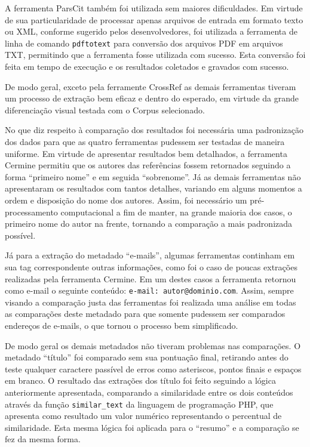 A ferramenta ParsCit também foi utilizada sem maiores dificuldades. Em virtude de sua particularidade de processar apenas arquivos de entrada em formato texto ou XML, conforme sugerido pelos desenvolvedores, foi utilizada a ferramenta de linha de comando \texttt{pdftotext} para conversão dos arquivos PDF em arquivos TXT, permitindo que a ferramenta fosse utilizada com sucesso. Esta conversão foi feita em tempo de execução e os resultados coletados e gravados com sucesso.

De modo geral, exceto pela ferramente CrossRef as demais ferramentas tiveram um processo de extração bem eficaz e dentro do esperado, em virtude da grande diferenciação visual testada com o Corpus selecionado. 


No que diz respeito à comparação dos resultados foi necessária uma padronização dos dados para que as quatro ferramentas pudessem ser testadas de maneira uniforme. Em virtude de apresentar resultados bem detalhados, a ferramenta Cermine permitiu que os autores das referências fossem retornados seguindo a forma ``primeiro nome'' e em seguida ``sobrenome''. Já as demais ferramentas não apresentaram os resultados com tantos detalhes, variando em alguns momentos a ordem e disposição do nome dos autores. Assim, foi necessário um pré-processamento computacional a fim de manter, na grande maioria dos casos, o primeiro nome do autor na frente, tornando a comparação a mais padronizada possível.

Já para a extração do metadado ``e-mails'', algumas ferramentas continham em sua tag correspondente outras informações, como foi o caso de poucas extrações realizadas pela ferramenta Cermine. Em um destes casos a ferramenta retornou como e-mail o seguinte conteúdo: \texttt{e-mail: autor@dominio.com}. Assim, sempre visando a comparação justa das ferramentas foi realizada uma análise em todas as comparações deste metadado para que somente pudessem ser comparados endereços de e-mails, o que tornou o processo bem simplificado.

De modo geral os demais metadados não tiveram problemas nas comparações. O metadado ``título'' foi comparado sem sua pontuação final, retirando antes do teste qualquer caractere passível de erros como asteriscos, pontos finais e espaços em branco. O resultado das extrações dos título foi feito seguindo a lógica anteriormente apresentada, comparando a similaridade entre os dois conteúdos através da função \texttt{similar\_text} da linguagem de programação PHP, que apresenta como resultado um valor numérico representando o percentual de similaridade. Esta mesma lógica foi aplicada para o ``resumo'' e a comparação se fez da mesma forma.

